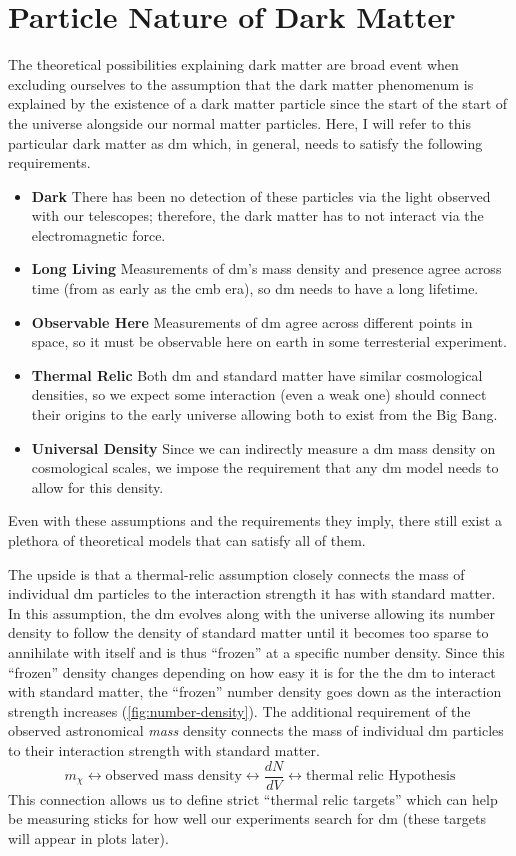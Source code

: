 \section{Particle Nature of Dark Matter}
The theoretical possibilities explaining dark matter are broad \cite{darksectors-2016}
event when excluding ourselves to the assumption that the dark matter phenomenum is explained
by the existence of a dark matter particle since the start of the start of the universe alongside
our normal matter particles. Here, I will refer to this particular dark matter
as \gls{dm} which, in general, needs to satisfy the following requirements.
\begin{itemize}
    \item \textbf{Dark} There has been no detection of these particles via the light observed with our telescopes;
          therefore, the dark matter has to not interact via the electromagnetic force.
    \item \textbf{Long Living} Measurements of \gls{dm}'s mass density and presence agree across time
          (from as early as the \gls{cmb} era), so \gls{dm} needs to have a long lifetime.
    \item \textbf{Observable Here} Measurements of \gls{dm} agree across different points in space,
          so it must be observable here on earth in some terresterial experiment.
    \item \textbf{Thermal Relic} Both \gls{dm} and standard matter have similar
          cosmological densities, so we expect some interaction (even a weak one) should connect their
          origins to the early universe allowing both to exist from the Big Bang.
    \item \textbf{Universal Density} Since we can indirectly measure a \gls{dm} mass density on
          cosmological scales, we impose the requirement that any \gls{dm} model needs to allow for
          this density.
\end{itemize}
Even with these assumptions and the requirements they imply, there still exist a plethora of
theoretical models that can satisfy all of them.

The upside is that a thermal-relic assumption closely connects the mass of individual \gls{dm} particles
to the interaction strength it has with standard matter. In this assumption, the \gls{dm} evolves along
with the universe allowing its number density to follow the density of standard matter until it becomes
too sparse to annihilate with itself and is thus ``frozen'' at a specific number density. Since this ``frozen''
density changes depending on how easy it is for the the \gls{dm} to interact with standard matter,
the ``frozen'' number density goes down as the interaction strength increases (\cref{fig:number-density}).
The additional requirement of the observed astronomical \emph{mass} density connects
the mass of individual \gls{dm} particles to their interaction strength with standard matter.
$$
    m_\chi \leftrightarrow \text{observed mass density}
    \leftrightarrow \frac{dN}{dV} \leftrightarrow
    \text{thermal relic Hypothesis}
$$
This connection allows us to define strict ``thermal relic targets'' which can help be measuring
sticks for how well our experiments search for \gls{dm} (these targets will appear in plots later).

